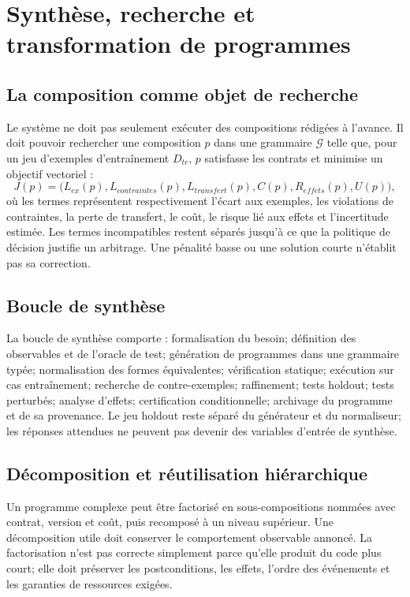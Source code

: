 \documentclass[11pt,a4paper]{article}
\theoremstyle{definition}
\theoremstyle{plain}
\theoremstyle{remark}
\begin{document}
\section{Synthèse, recherche et transformation de programmes}
\subsection{La composition comme objet de recherche}
Le système ne doit pas seulement exécuter des compositions rédigées à l'avance. Il doit pouvoir rechercher une composition $p$ dans une grammaire $\mathcal{G}$ telle que, pour un jeu d'exemples d'entraînement $D_{tr}$, $p$ satisfasse les contrats et minimise un objectif vectoriel :
\[
J(p)=\big(L_{ex}(p),L_{contraintes}(p),L_{transfert}(p),C(p),R_{effets}(p),U(p)\big),
\]
où les termes représentent respectivement l'écart aux exemples, les violations de contraintes, la perte de transfert, le coût, le risque lié aux effets et l'incertitude estimée. Les termes incompatibles restent séparés jusqu'à ce que la politique de décision justifie un arbitrage. Une pénalité basse ou une solution courte n'établit pas sa correction.

\subsection{Boucle de synthèse}
La boucle de synthèse comporte : formalisation du besoin; définition des observables et de l'oracle de test; génération de programmes dans une grammaire typée; normalisation des formes équivalentes; vérification statique; exécution sur cas entraînement; recherche de contre-exemples; raffinement; tests holdout; tests perturbés; analyse d'effets; certification conditionnelle; archivage du programme et de sa provenance. Le jeu holdout reste séparé du générateur et du normaliseur; les réponses attendues ne peuvent pas devenir des variables d'entrée de synthèse.

\subsection{Décomposition et réutilisation hiérarchique}
Un programme complexe peut être factorisé en sous-compositions nommées avec contrat, version et coût, puis recomposé à un niveau supérieur. Une décomposition utile doit conserver le comportement observable annoncé. La factorisation n'est pas correcte simplement parce qu'elle produit du code plus court; elle doit préserver les postconditions, les effets, l'ordre des événements et les garanties de ressources exigées.
\end{document}
